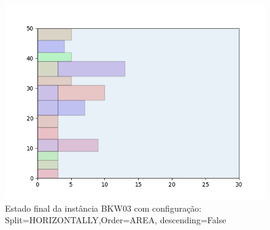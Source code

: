 \begin{figure}[H]
    \centering
    \caption[]{Estado final da instância BKW03 com configuração: Split=HORIZONTALLY,Order=AREA, descending=False}
    \label{fig:bkw03-horizontally-area-false}
    \includegraphics[scale=0.5]{output/figures/bkw/bkw03/horizontally/area/false/00}
\end{figure}